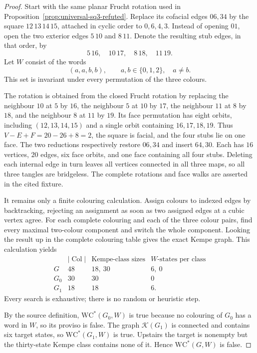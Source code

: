 \begin{proof}
Start with the same planar Frucht rotation used in
Proposition~\ref{prop:universal-sq3-refuted}.  Replace its cofacial edges
\(06,34\) by the square \(12\,13\,14\,15\), attached in cyclic order to
\(0,6,4,3\).  Instead of opening \(01\), open the two exterior edges
\(5\,10\) and \(8\,11\).  Denote the resulting stub edges, in that order, by
\[
  5\,16,\quad 10\,17,\quad 8\,18,\quad 11\,19.
\]
Let \(W\) consist of the words
\[
             (a,a,b,b),\qquad a,b\in\{0,1,2\},\quad a\ne b.
\]
This set is invariant under every permutation of the three colours.

The rotation is obtained from the closed Frucht rotation by replacing the
neighbour \(10\) at \(5\) by \(16\), the neighbour \(5\) at \(10\) by
\(17\), the neighbour \(11\) at \(8\) by \(18\), and the neighbour \(8\)
at \(11\) by \(19\).  Its face permutation has eight orbits, including
\((12,13,14,15)\) and a single orbit containing \(16,17,18,19\).
Thus \(V-E+F=20-26+8=2\), the square is facial, and the four stubs lie on
one face.  The two reductions respectively restore \(06,34\) and insert
\(64,30\).  Each has \(16\) vertices, \(20\) edges, six face orbits, and one
face containing all four stubs.  Deleting each internal edge in turn leaves
all vertices connected in all three maps, so all three tangles are
bridgeless.  The complete rotations and face walks are asserted in the
cited fixture.

It remains only a finite colouring calculation.  Assign colours to indexed
edges by backtracking, rejecting an assignment as soon as two assigned edges
at a cubic vertex agree.  For each complete colouring and each of the three
colour pairs, find every maximal two-colour component and switch the whole
component.  Looking the result up in the complete colouring table gives the
exact Kempe graph.  This calculation yields
\[
\begin{array}{c|c|c|c}
 &|\operatorname{Col}|&\text{Kempe-class sizes}&\text{\(W\)-states per class}\\
 \hline
 G   &48&18,\ 30&6,\ 0\\
 G_0 &30&30&0\\
 G_1 &18&18&6.
\end{array}
\]
Every search is exhaustive; there is no random or heuristic step.

By the source definition, \(\mathrm{WC}^{*}(G_0,W)\) is true because no
colouring of \(G_0\) has a word in \(W\), so its proviso is false.
The graph \(\mathcal K(G_1)\) is connected and contains six target states,
so \(\mathrm{WC}^{*}(G_1,W)\) is true.  Upstairs the target is nonempty but
the thirty-state Kempe class contains none of it.  Hence
\(\mathrm{WC}^{*}(G,W)\) is false.
\end{proof}

